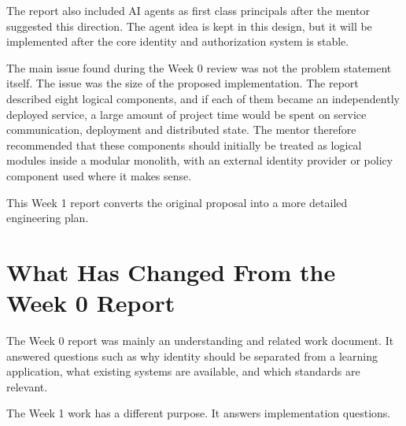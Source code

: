\documentclass[11pt,a4paper]{article}
\begin{document}
The report also included AI agents as first class principals after the mentor suggested this direction. The agent idea is kept in this design, but it will be implemented after the core identity and authorization system is stable.

The main issue found during the Week 0 review was not the problem statement itself. The issue was the size of the proposed implementation. The report described eight logical components, and if each of them became an independently deployed service, a large amount of project time would be spent on service communication, deployment and distributed state. The mentor therefore recommended that these components should initially be treated as logical modules inside a modular monolith, with an external identity provider or policy component used where it makes sense.

This Week 1 report converts the original proposal into a more detailed engineering plan.

\section{What Has Changed From the Week 0 Report}

The Week 0 report was mainly an understanding and related work document. It answered questions such as why identity should be separated from a learning application, what existing systems are available, and which standards are relevant.

The Week 1 work has a different purpose. It answers implementation questions.
\end{document}
